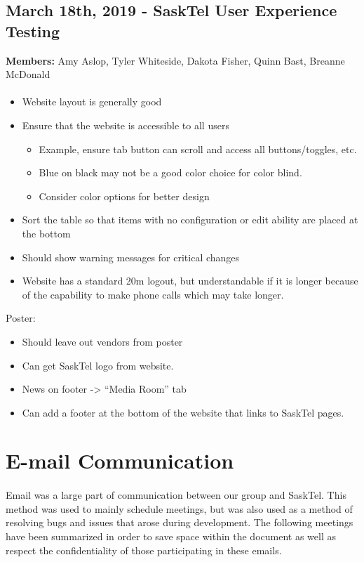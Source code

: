 \documentclass[12pt]{article}
\begin{document}
\subsection{March 18th, 2019 - SaskTel User Experience Testing}
\textbf{Members:} Amy Aslop, Tyler Whiteside, Dakota Fisher, Quinn Bast, Breanne McDonald
\paragraph{} 
\begin{itemize}
	\item Website layout is generally good
	\item Ensure that the website is accessible to all users
	\begin{itemize}
		\item Example, ensure tab button can scroll and access all buttons/toggles, etc.
		\item Blue on black may not be a good color choice for color blind.
		\item Consider color options for better design
	\end{itemize}
	\item Sort the table so that items with no configuration or edit ability are placed at the bottom
	\item Should show warning messages for critical changes
	\item Website has a standard 20m logout, but understandable if it is longer because of the capability to make phone calls which may take longer.
\end{itemize}
Poster:
\begin{itemize}
	\item Should leave out vendors from poster
	\item Can get SaskTel logo from website.
	\item News on footer -> “Media Room” tab
	\item Can add a footer at the bottom of the website that links to SaskTel pages.
\end{itemize}

\section{E-mail Communication}
\paragraph{}
	Email was a large part of communication between our group and SaskTel. This method was used to mainly schedule meetings, but was also used as a method of resolving bugs and issues that arose during development. The following meetings have been summarized in order to save space within the document as well as respect the confidentiality of those participating in these emails.
\end{document}
